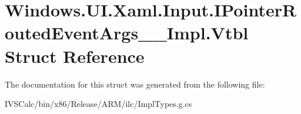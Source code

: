\hypertarget{struct_windows_1_1_u_i_1_1_xaml_1_1_input_1_1_i_pointer_routed_event_args_____impl_1_1_vtbl}{}\section{Windows.\+U\+I.\+Xaml.\+Input.\+I\+Pointer\+Routed\+Event\+Args\+\_\+\+\_\+\+Impl.\+Vtbl Struct Reference}
\label{struct_windows_1_1_u_i_1_1_xaml_1_1_input_1_1_i_pointer_routed_event_args_____impl_1_1_vtbl}


The documentation for this struct was generated from the following file\+:\begin{DoxyCompactItemize}
\item 
I\+V\+S\+Calc/bin/x86/\+Release/\+A\+R\+M/ilc/Impl\+Types.\+g.\+cs\end{DoxyCompactItemize}
